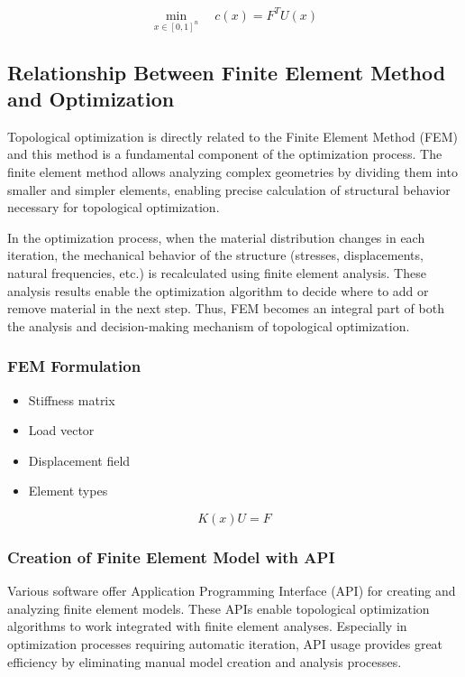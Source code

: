 \begin{equation}
\min_{x \in [0,1]^n} \quad c(x) = F^T U(x)
\end{equation}

\subsection{Relationship Between Finite Element Method and Optimization}
Topological optimization is directly related to the Finite Element Method (FEM) and this method is a fundamental component of the optimization process. The finite element method allows analyzing complex geometries by dividing them into smaller and simpler elements, enabling precise calculation of structural behavior necessary for topological optimization.

In the optimization process, when the material distribution changes in each iteration, the mechanical behavior of the structure (stresses, displacements, natural frequencies, etc.) is recalculated using finite element analysis. These analysis results enable the optimization algorithm to decide where to add or remove material in the next step. Thus, FEM becomes an integral part of both the analysis and decision-making mechanism of topological optimization.

\subsubsection{FEM Formulation}
\begin{itemize}
    \item Stiffness matrix
    \item Load vector
    \item Displacement field
    \item Element types
\end{itemize}

\begin{equation}
K(x)U = F
\end{equation}

\subsubsection{Creation of Finite Element Model with API}
Various software offer Application Programming Interface (API) for creating and analyzing finite element models. These APIs enable topological optimization algorithms to work integrated with finite element analyses. Especially in optimization processes requiring automatic iteration, API usage provides great efficiency by eliminating manual model creation and analysis processes.

